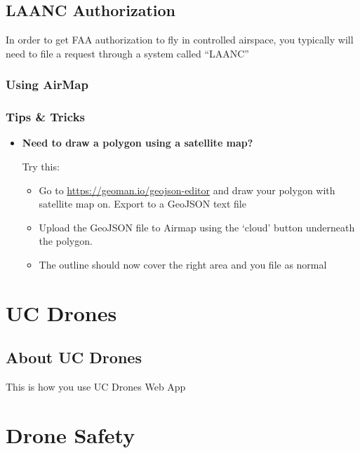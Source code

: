 \documentclass[
]{book}
\providecommand{\tightlist}{%
  \setlength{\itemsep}{0pt}\setlength{\parskip}{0pt}}
\begin{document}
\hypertarget{ch-LAANC}{%
\chapter{LAANC Authorization}\label{ch-LAANC}}

In order to get FAA authorization to fly in controlled airspace, you typically will need to file a request through a system called ``LAANC''

\hypertarget{using-airmap}{%
\section{Using AirMap}\label{using-airmap}}

\hypertarget{tips-tricks}{%
\section{Tips \& Tricks}\label{tips-tricks}}

\begin{itemize}
\item
  \textbf{Need to draw a polygon using a satellite map?}

  Try this:

  \begin{itemize}
  \tightlist
  \item
    Go to \url{https://geoman.io/geojson-editor} and draw your polygon with satellite map on. Export to a GeoJSON text file
  \item
    Upload the GeoJSON file to Airmap using the `cloud' button underneath the polygon.
  \item
    The outline should now cover the right area and you file as normal
  \end{itemize}
\end{itemize}

\hypertarget{part-uc-drones}{%
\part{UC Drones}\label{part-uc-drones}}

\hypertarget{ch-about-UCdrones}{%
\chapter{About UC Drones}\label{ch-about-UCdrones}}

This is how you use UC Drones Web App

\hypertarget{part-drone-safety}{%
\part{Drone Safety}\label{part-drone-safety}}
\end{document}
